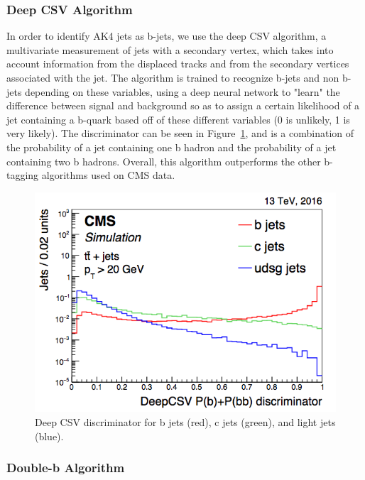 \subsubsection{Deep CSV Algorithm}

In order to identify AK4 jets as b-jets, we use the deep CSV algorithm, a multivariate measurement of jets with a secondary vertex, which takes into account information from the displaced tracks and from the secondary vertices associated with the jet. The algorithm is trained to recognize b-jets and non b-jets depending on these variables, using a deep neural network to "learn" the difference between signal and background so as to assign a certain likelihood of a jet containing a b-quark based off of these different variables (0 is unlikely, 1 is very likely). The discriminator can be seen in Figure~\ref{Fig:dcsv}, and is a combination of the probability of a jet containing one b hadron and the probability of a jet containing two b hadrons. Overall, this algorithm outperforms the other b-tagging algorithms used on CMS data.
\begin{figure}[h!]
    \centering
        \includegraphics[width=\textwidth]{F4/dcsv.png}
        \caption{Deep CSV discriminator for b jets (red), c jets (green), and light jets (blue).}
        \label{Fig:dcsv}
\end{figure}

\subsubsection{Double-b Algorithm}

